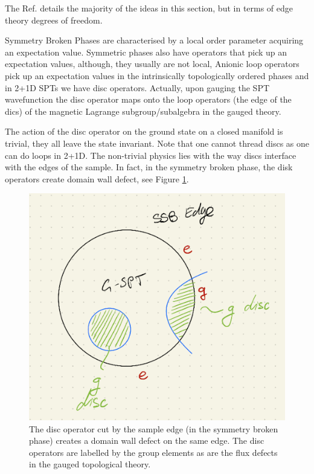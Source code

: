 \documentclass[a4paper,twocolumn,11pt]{quantumarticle}
\begin{document}
The Ref. \cite{Kawagoe_2021} details the majority of the ideas in this section, but in terms of edge theory degrees of freedom.

Symmetry Broken Phases are characterised by a local order parameter acquiring an expectation value. Symmetric phases also have operators that pick up an expectation values, although, they usually are not local, Anionic loop operators pick up an expectation values in the intrinsically topologically ordered phases and in 2+1D SPTs we have disc operators. Actually, upon gauging the SPT wavefunction the disc operator maps onto the loop operators (the edge of the dics) of the magnetic Lagrange subgroup/subalgebra in the gauged theory.

The action of the disc operator on the ground state on a closed manifold is trivial, they all leave the state invariant. Note that one cannot thread discs as one can do loops in 2+1D. The non-trivial physics lies with the way discs interface with the edges of the sample. In fact, in the symmetry broken phase, the disk operators create domain wall defect, see Figure \ref{fig:disc_domain}. \begin{figure}
\centering
\includegraphics[width=\linewidth]{Figures/disc_domain_wall.png}
\caption{The disc operator cut by the sample edge (in the symmetry broken phase) creates a domain wall defect on the same edge. The disc operators are labelled by the group elements as are the flux defects in the gauged topological theory.}
\label{fig:disc_domain}
\end{figure}
\end{document}
